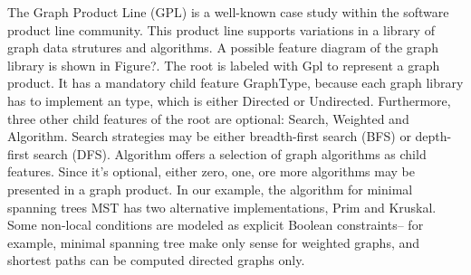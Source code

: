 

The Graph Product Line (GPL) is a well-known case study within the software product line community. This product line
 supports variations in a library of graph data strutures and algorithms. A possible feature diagram of the graph
 library is shown in Figure?. The root is labeled with Gpl to represent a graph product. It has a mandatory child feature
 GraphType, because each graph library has to implement an type, which is either Directed or Undirected. Furthermore,
 three other child features of the root are optional: Search, Weighted and Algorithm. Search strategies may be either
  breadth-first search (BFS) or depth-first search (DFS). Algorithm offers a selection of graph algorithms as child
  features. Since it's optional, either zero, one, ore more algorithms may be presented in a graph product. In our
  example, the algorithm for minimal spanning trees MST has two alternative implementations, Prim and Kruskal. Some
  non-local conditions are modeled as explicit Boolean constraints-- for example, minimal spanning tree make only
  sense for weighted graphs, and shortest paths can be computed directed graphs only.
